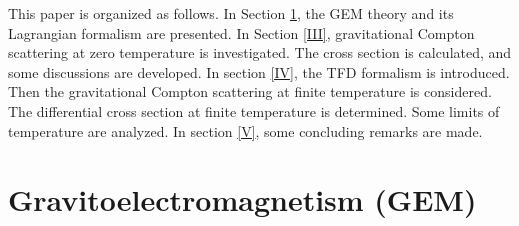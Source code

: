 \documentclass[11pt,showpacs,preprintnumbers,amsmath,amssymb,prd,nofootinbib,superscriptaddress]{revtex4-2}
\begin{document}
This paper is organized as follows. In Section \ref{II}, the GEM theory and its Lagrangian formalism are presented. In Section \ref{III}, gravitational Compton scattering at zero temperature is investigated. The cross section is calculated, and some discussions are developed. In section \ref{IV}, the TFD formalism is introduced. Then the gravitational Compton scattering at finite temperature is considered. The differential cross section at finite temperature is determined. Some limits of temperature are analyzed. In section \ref{V}, some concluding remarks are made.
 
 
\section{Gravitoelectromagnetism (GEM)}\label{II}
\end{document}
